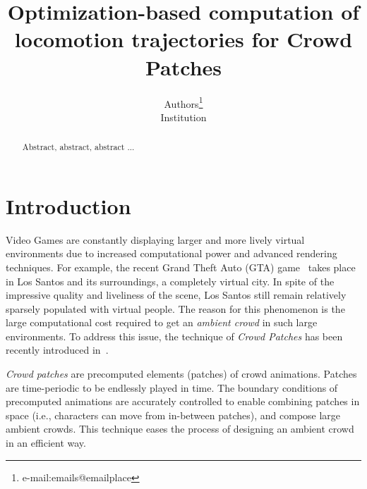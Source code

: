 \documentclass[conference]{acmsiggraph}
\title{Optimization-based computation of locomotion trajectories for Crowd Patches}
\author{Authors\thanks{e-mail:emails@emailplace}\\Institution}
\begin{document}

\maketitle

\begin{abstract}

Abstract, abstract, abstract ...


\end{abstract}

\begin{CRcatlist}
\end{CRcatlist}

\keywordlist


\TOGlinkslist


\copyrightspace

\section{Introduction}

Video Games are constantly displaying larger and more lively virtual environments due to increased computational power and advanced rendering techniques. For example, the recent Grand Theft Auto (GTA) game~\cite{GTA:web} takes place in Los Santos and its surroundings, a completely virtual city. In spite of the impressive quality and liveliness of the scene, Los Santos still remain relatively sparsely populated with virtual people. The reason for this phenomenon is the large computational cost required to get an {\it ambient crowd} in such large environments. To address this issue, the technique of {\it Crowd Patches} has been recently introduced in~\cite{Yersin:2009}. 

{\it Crowd patches} are precomputed elements (patches) of crowd animations. Patches are time-periodic to be endlessly played in time. The boundary conditions of precomputed animations are accurately controlled to enable combining patches in space (i.e., characters can move from in-between patches), and compose large ambient crowds. This technique eases the process of designing an ambient crowd in an efficient way. 
\end{document}
